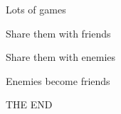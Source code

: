\documentclass[14pt]{beamer}
\begin{document}
\begin{frame}\Large
  \begin{center}
    Lots of games
  \end{center}
\end{frame}


\begin{frame}\Large
  \begin{center}
    Share them with friends
  \end{center}
\end{frame}

\begin{frame}\Large
  \begin{center}
    Share them with enemies
  \end{center}
\end{frame}

\begin{frame}\Large
  \begin{center}
  Enemies become friends
  \end{center}
\end{frame}

\begin{frame}\Large
  \begin{center}
    THE END
  \end{center}
\end{frame}
\end{document}
